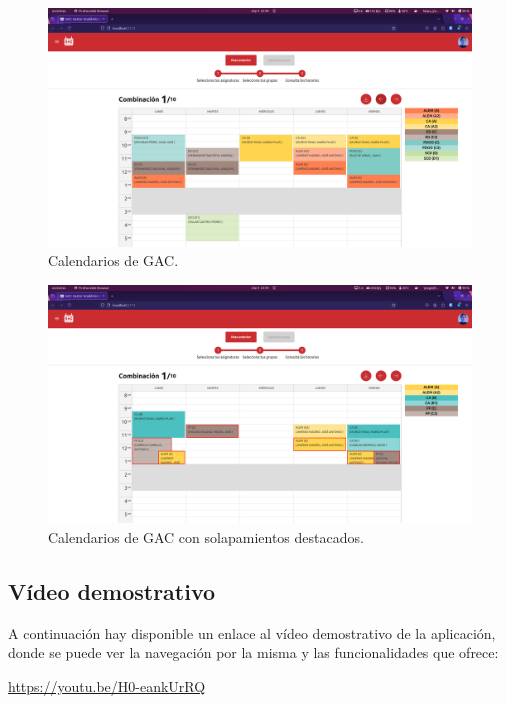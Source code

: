 \begin{figure}[H]
    \centering
    \includegraphics[width=1\textwidth]{imagenes/GAC_calendarios.png}
    \caption{Calendarios de GAC.}
    \label{fig:GAC_calendario}
\end{figure}
\vspace{3cm}
\begin{figure}[H]
    \centering
    \includegraphics[width=1\textwidth]{imagenes/GAC_solapamientos.png}
    \caption{Calendarios de GAC con solapamientos destacados.}
    \label{fig:GAC_calendario_solapamientos}
\end{figure}

\subsection{Vídeo demostrativo}

A continuación hay disponible un enlace al vídeo demostrativo de la aplicación, donde se puede ver la navegación por la misma y las funcionalidades que ofrece:\newline

\url{https://youtu.be/H0-eankUrRQ}





